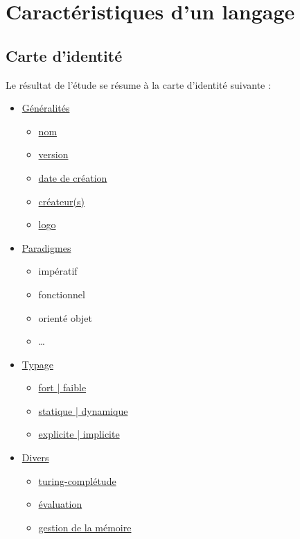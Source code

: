 \section{Caractéristiques d'un langage}

\subsection{Carte d'identité}

Le résultat de l'étude se résume à la carte d'identité suivante :\\

\renewcommand{\labelitemi}{\textbullet}
\begin{itemize}
\item \hyperref[generalites]{Généralités}
	\begin{itemize}
	\item \hyperref[nom]{nom}
	\item \hyperref[version]{version}
	\item \hyperref[date_creation]{date de création}
	\item \hyperref[createur]{créateur(s)}
	\item \hyperref[logo]{logo}\\
	\end{itemize}
\item \hyperref[paradigmes]{Paradigmes}
	\begin{itemize}
	\item impératif
	\item fonctionnel
	\item orienté objet
	\item …\\
	\end{itemize}
\item \hyperref[typage]{Typage}
	\begin{itemize}
	\item \hyperref[fort_faible]{fort | faible}
	\item \hyperref[statique_dynamique]{statique | dynamique}
	\item \hyperref[explicite_implicite]{explicite | implicite}\\
	\end{itemize}
\item \hyperref[divers]{Divers}
	\begin{itemize}
	\item \hyperref[turing]{turing-complétude}
	\item \hyperref[evaluation]{évaluation}
	\item \hyperref[memoire]{gestion de la mémoire}\\

\end{itemize}
\end{itemize}

